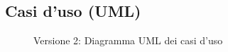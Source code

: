 \begin{landscape}
    \subsection{Casi d'uso (UML)}
    \vfill
    \begin{figure}[H]
        \centering
        \caption{Versione 2: Diagramma UML dei casi d'uso}
        \label{fig:use_case_uml_v2}
    \end{figure}
\end{landscape}